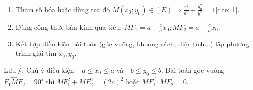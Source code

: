 \begin{enumerate}
\item Tham số hóa hoặc dùng tọa độ $M(x_0; y_0) \in (E) \Rightarrow \frac{x_0^2}{a^2} + \frac{y_0^2}{b^2} = 1$[cite: 1].
\item Dùng công thức bán kính qua tiêu: $MF_1 = a + \frac{c}{a}x_0; MF_2 = a - \frac{c}{a}x_0$.
\item Kết hợp điều kiện bài toán (góc vuông, khoảng cách, diện tích...) lập phương trình giải tìm $x_0, y_0$.
\end{enumerate}
Lưu ý: Chú ý điều kiện $-a \le x_0 \le a$ và $-b \le y_0 \le b$. Bài toán góc vuông $\widehat{F_1MF_2} = 90^\circ$ thì $MF_1^2 + MF_2^2 = (2c)^2$ hoặc $\overrightarrow{MF_1} \cdot \overrightarrow{MF_2} = 0$.
